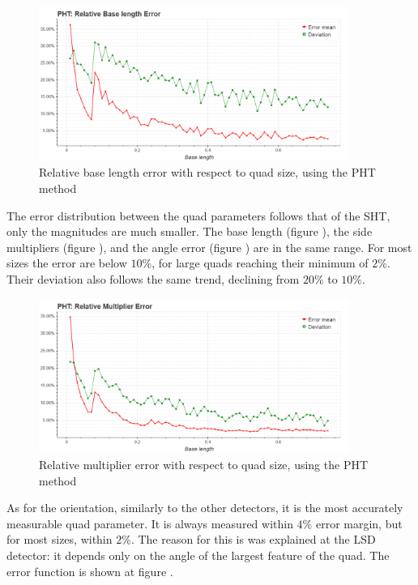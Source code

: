 \begin{figure}[ht]
	\centering
	\includegraphics[width=0.9\textwidth]{figures/plots/pht_relative_base_length_error.png}
	\caption{Relative base length error with respect to quad size, using the PHT method}
	\label{fig:phtRelBaseErr}
\end{figure}
The error distribution between the quad parameters follows that of the SHT, only the magnitudes are much smaller.
The base length (figure ), the side multipliers (figure ), and the angle error (figure ) are in the same range.
For most sizes the error are below $10\%$, for large quads reaching their minimum of $2\%$.
Their deviation also follows the same trend, declining from $20\%$ to $10\%$.

\begin{figure}[ht]
	\centering
	\includegraphics[width=0.9\textwidth]{figures/plots/pht_relative_multiplier_error.png}
	\caption{Relative multiplier error with respect to quad size, using the PHT method}
	\label{fig:phtRelMulErr}
\end{figure}
As for the orientation, similarly to the other detectors, it is the most accurately measurable quad parameter.
It is always measured within $4\%$ error margin, but for most sizes, within $2\%$.
The reason for this is was explained at the LSD detector: it depends only on the angle of the largest feature of the quad.
The error function is shown at figure .

